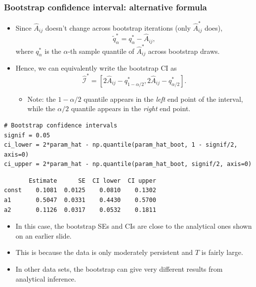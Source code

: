 \begin{frame}[fragile]
\frametitle{Bootstrap confidence interval: alternative formula}
\begin{itemize}
\item Since $\hat{A}_{ij}$ doesn't change across bootstrap iterations (only $\hat{A}_{ij}^*$ does),
\[\tilde{q}_\alpha^* = q_\alpha^* - \hat{A}_{ij},\]
where $q_\alpha^*$ is the $\alpha$-th sample quantile of $\hat{A}_{ij}^*$ across bootstrap draws.
\item Hence, we can equivalently write the bootstrap CI as
\[\hat{\mathcal{I}}^* = \left[2\hat{A}_{ij}-q_{1-\alpha/2}^*, 2\hat{A}_{ij} - q_{\alpha/2}^*\right].\]
\vspace{-1.5\baselineskip}
\begin{itemize}
\item Note: the $1-\alpha/2$ quantile appears in the \emph{left} end point of the interval, while the $\alpha/2$ quantile appears in the \emph{right} end point.
\end{itemize}
\end{itemize}
\bigskip
\scriptsize
\begin{verbatim}
# Bootstrap confidence intervals
signif = 0.05
ci_lower = 2*param_hat - np.quantile(param_hat_boot, 1 - signif/2, axis=0)
ci_upper = 2*param_hat - np.quantile(param_hat_boot, signif/2, axis=0)
\end{verbatim}
\end{frame}

\begin{frame}[fragile]
\begin{verbatim}
       Estimate      SE  CI lower  CI upper
const    0.1081  0.0125    0.0810    0.1302
a1       0.5047  0.0331    0.4430    0.5700
a2       0.1126  0.0317    0.0532    0.1811
\end{verbatim}
\bigskip
\begin{itemize}
\item In this case, the bootstrap SEs and CIs are close to the analytical ones shown on an earlier slide.
\item This is because the data is only moderately persistent and $T$ is fairly large.
\item In other data sets, the bootstrap can give very different results from analytical inference.
\end{itemize}
\end{frame}

